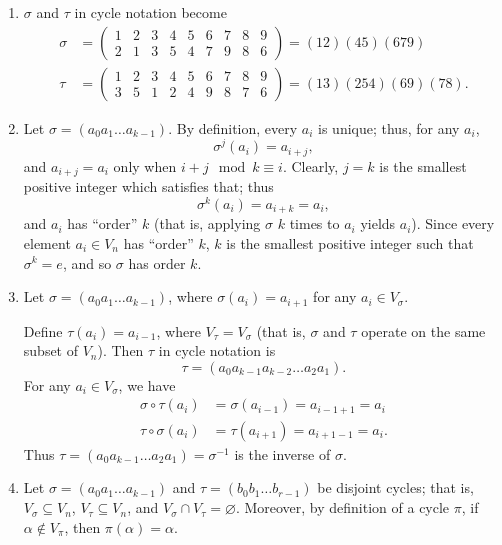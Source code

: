\documentclass{homework}
\begin{document}
\begin{solution}
  \begin{enumerate}[label=(\alph*)]
    \item $\sigma$ and $\tau$ in cycle notation become
      \begin{align*}
        \sigma &= \begin{pmatrix} 1&2&3&4&5&6&7&8&9\\2&1&3&5&4&7&9&8&6 \end{pmatrix}=(12)(45)(679)\\
        \tau &= \begin{pmatrix} 1&2&3&4&5&6&7&8&9\\3&5&1&2&4&9&8&7&6 \end{pmatrix} =(13)(254)(69)(78)
      .\end{align*}

    \item Let $\sigma=(a_0a_1\ldots a_{k-1})$. By definition, every $a_i$ is unique; thus, for any
      $a_i$, \[
        \sigma^{j}(a_i)=a_{i+j}
      ,\] and $a_{i+j}=a_i$ only when  $i+j\mod{k}\equiv i$. Clearly, $j=k$ is the smallest positive
      integer which satisfies that; thus \[
        \sigma^{k}(a_i)=a_{i+k}=a_i
      ,\] and $a_i$ has ``order'' $k$ (that is, applying $\sigma$ $k$ times to $a_i$ yields $a_i$).
      Since every element $a_i\in V_n$ has ``order'' $k$, $k$ is the smallest positive integer such
      that $ \sigma^{k}=e$, and so $\sigma$ has order $k$.

    \item Let $\sigma=(a_0a_1\ldots a_{k-1})$, where $\sigma(a_i)=a_{i+1}$ for any $a_i\in
      V_\sigma$.

      Define $\tau(a_i)=a_{i-1}$, where $V_\tau=V_\sigma$ (that is, $\sigma$ and $\tau$ operate on
      the same subset of $V_n$). Then $\tau$ in cycle notation is \[
        \tau = (a_0a_{k-1}a_{k-2}\ldots a_2a_1)
      .\] For any $a_i\in V_\sigma$, we have
      \begin{align*}
        \sigma\circ \tau(a_i)&=\sigma(a_{i-1})=a_{i-1+1}=a_i\\
        \tau\circ \sigma(a_i)&=\tau(a_{i+1})=a_{i+1-1}=a_i
      .\end{align*}
      Thus $\tau=(a_0a_{k-1}\ldots a_2a_1)=\sigma^{-1}$ is the inverse of $\sigma$.
      
    \item Let $\sigma=(a_0a_1\ldots a_{k-1})$ and $\tau=(b_0b_1\ldots b_{r-1})$ be disjoint cycles;
      that is, $V_\sigma\subseteq V_n$, $V_\tau\subseteq V_n$, and $V_\sigma\cap
      V_\tau=\varnothing$. Moreover, by definition of a cycle $\pi$, if $\alpha\not\in V_\pi$, then
      $\pi(\alpha)=\alpha$.


\end{enumerate}
\end{solution}
\end{document}
